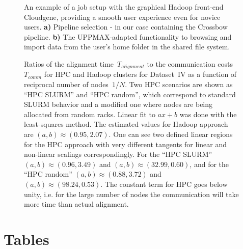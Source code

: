 \documentclass[10pt]{article}
\begin{document}
\begin{figure}[!ht]
\begin{subfigure}[b]{0.6\textwidth}
		\subcaption{}
	\end{subfigure}
	\caption{An example of a job setup with the graphical Hadoop front-end Cloudgene, providing a smooth user experience even for novice users. \textbf{a)} Pipeline selection - in our case containing the Crossbow pipeline. \textbf{b)} The UPPMAX-adapted functionality to browsing and import data from the user's home folder in the shared file system.}
	\label{fig:fig4}
\end{figure}


\begin{figure}[!ht]
	\small
	
	\normalsize
	\caption{Ratios of the alignment time~$T_{alignment}$ to the communication costs~$T_{comm}$ for HPC and Hadoop clusters for Dataset~IV as a function of reciprocal number of nodes~$1/N$. Two HPC scenarios are shown as ``HPC SLURM'' and ``HPC random'', which correspond to standard SLURM behavior and a modified one where nodes are being allocated from random racks.
Linear fit  to $ax+b$ was done with the least-squares method.
The estimated values for Hadoop approach are $(a,b)\approx(0.95,2.07)$.
One  can see two defined linear regions for the HPC approach with very different tangents for linear and non-linear scalings correspondingly.
For  the ``HPC SLURM'' $(a,b)\approx (0.96, 3.49)$ and $(a,b)\approx (32.99, 0.60)$, and for  the ``HPC random'' $(a,b)\approx (0.88, 3.72)$ and $(a,b)\approx (98.24, 0.53)$.
 The constant term for HPC goes below unity, i.e. for the large number of nodes the communication will take more time than actual alignment. 
}
	\label{fig:fig3}
\end{figure}







\section*{Tables}
\end{document}
